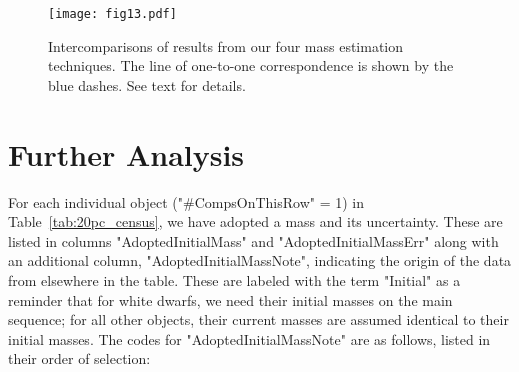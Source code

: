 \documentclass[twocolumn,tighten,twocolappendix]{aastex631}
\begin{document}
\begin{figure*}
\texttt{[image: fig13.pdf]}
\caption{Intercomparisons of results from our four mass estimation techniques. The line of one-to-one correspondence is shown by the blue dashes. See text for details.\label{fig:mass_estimate_intercomparisons}}
\end{figure*}

\section{Further Analysis\label{sec:further_analysis}}

For each individual object ("\#CompsOnThisRow" = 1) in Table~\ref{tab:20pc_census}, we have adopted a mass and its uncertainty. These are listed in columns "AdoptedInitialMass" and "AdoptedInitialMassErr" along with an additional column, "AdoptedInitialMassNote", indicating the origin of the data from elsewhere in the table. These are labeled with the term "Initial" as a reminder that for white dwarfs, we need their initial masses on the main sequence; for all other objects, their current masses are assumed identical to their initial masses. The codes for "AdoptedInitialMassNote" are as follows, listed in their order of selection:
\end{document}
